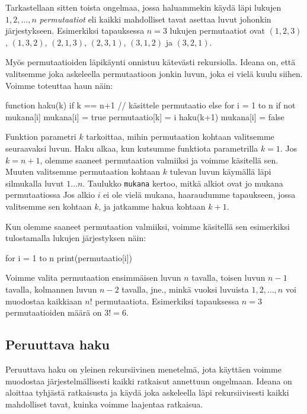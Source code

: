 
Tarkastellaan sitten toista ongelmaa, jossa haluammekin
käydä läpi lukujen $1,2,\dots,n$ \emph{permutaatiot}
eli kaikki mahdolliset tavat asettaa luvut johonkin järjestykseen.
Esimerkiksi tapauksessa $n=3$ lukujen permutaatiot ovat
$(1,2,3)$, $(1,3,2)$, $(2,1,3)$, $(2,3,1)$, $(3,1,2)$ ja $(3,2,1)$.

Myös permutaatioiden läpikäynti onnistuu kätevästi rekursiolla.
Ideana on, että valitsemme joka askeleella permutaatioon
jonkin luvun, joka ei vielä kuulu siihen.
Voimme toteuttaa haun näin:

\begin{code}
function haku(k)
    if k == n+1
        // käsittele permutaatio
    else
        for i = 1 to n
            if not mukana[i]
                mukana[i] = true
                permutaatio[k] = i
                haku(k+1)
                mukana[i] = false
\end{code}

Funktion parametri $k$ tarkoittaa, mihin permutaation kohtaan
valitsemme seuraavaksi luvun.
Haku alkaa, kun kutsumme funktiota parametrilla $k=1$.
Jos $k=n+1$, olemme saaneet permutaation valmiiksi
ja voimme käsitellä sen.
Muuten valitsemme permutaation kohtaan $k$ tulevan luvun
käymällä läpi silmukalla luvut $1 \dots n$.
Taulukko \texttt{mukana} kertoo, mitkä alkiot
ovat jo mukana permutaatiossa
Jos alkio $i$ ei ole vielä mukana, haaraudumme tapaukseen,
jossa valitsemme sen kohtaan $k$, ja jatkamme hakua kohtaan $k+1$.

Kun olemme saaneet permutaation valmiiksi,
voimme käsitellä sen esimerkiksi tulostamalla lukujen
järjestyksen näin:

\begin{code}
for i = 1 to n
    print(permutaatio[i])
\end{code}

Voimme valita permutaation ensimmäisen luvun $n$ tavalla,
toisen luvun $n-1$ tavalla,
kolmannen luvun $n-2$ tavalla, jne.,
minkä vuoksi luvuista $1,2,\dots,n$ voi muodostaa
kaikkiaan $n!$ permutaatiota.
Esimerkiksi tapauksessa $n=3$ permutaatioiden määrä on $3!=6$.

\subsection{Peruuttava haku}


Peruuttava haku on yleinen rekursiivinen menetelmä,
jota käyttäen voimme muodostaa järjestelmällisesti
kaikki ratkaisut annettuun ongelmaan.
Ideana on aloittaa tyhjästä ratkaisusta ja käydä
joka askeleella läpi rekursiivisesti kaikki mahdolliset tavat,
kuinka voimme laajentaa ratkaisua.

